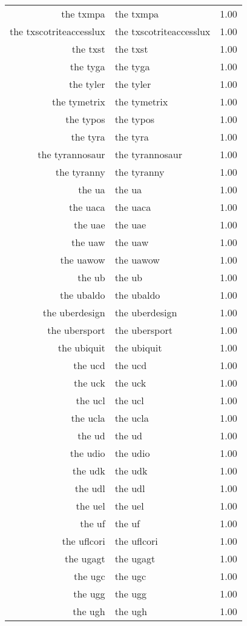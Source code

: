\begin{table}[ht]
\begin{tabular}{rlr}
  the txmpa & the txmpa & 1.00 \\ 
  the txscotriteaccesslux & the txscotriteaccesslux & 1.00 \\ 
  the txst & the txst & 1.00 \\ 
  the tyga & the tyga & 1.00 \\ 
  the tyler & the tyler & 1.00 \\ 
  the tymetrix & the tymetrix & 1.00 \\ 
  the typos & the typos & 1.00 \\ 
  the tyra & the tyra & 1.00 \\ 
  the tyrannosaur & the tyrannosaur & 1.00 \\ 
  the tyranny & the tyranny & 1.00 \\ 
  the ua & the ua & 1.00 \\ 
  the uaca & the uaca & 1.00 \\ 
  the uae & the uae & 1.00 \\ 
  the uaw & the uaw & 1.00 \\ 
  the uawow & the uawow & 1.00 \\ 
  the ub & the ub & 1.00 \\ 
  the ubaldo & the ubaldo & 1.00 \\ 
  the uberdesign & the uberdesign & 1.00 \\ 
  the ubersport & the ubersport & 1.00 \\ 
  the ubiquit & the ubiquit & 1.00 \\ 
  the ucd & the ucd & 1.00 \\ 
  the uck & the uck & 1.00 \\ 
  the ucl & the ucl & 1.00 \\ 
  the ucla & the ucla & 1.00 \\ 
  the ud & the ud & 1.00 \\ 
  the udio & the udio & 1.00 \\ 
  the udk & the udk & 1.00 \\ 
  the udl & the udl & 1.00 \\ 
  the uel & the uel & 1.00 \\ 
  the uf & the uf & 1.00 \\ 
  the uflcori & the uflcori & 1.00 \\ 
  the ugagt & the ugagt & 1.00 \\ 
  the ugc & the ugc & 1.00 \\ 
  the ugg & the ugg & 1.00 \\ 
  the ugh & the ugh & 1.00 \\ 

\end{tabular}
\end{table}
